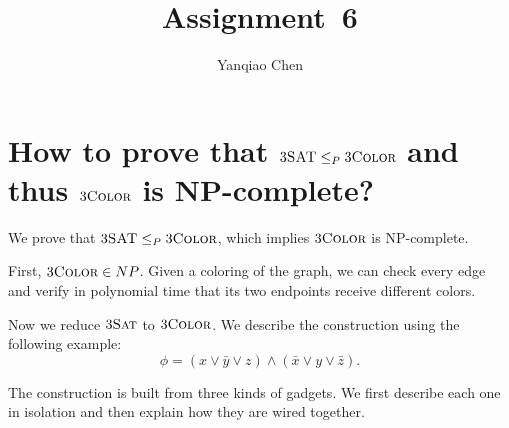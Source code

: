 \documentclass[manuscript,nonacm]{acmart}
\theoremstyle{definition}
\begin{document}
\title{Assignment~6}

\author{Yanqiao Chen}

\maketitle
{}

\section{How to prove that $3\textsc{SAT} \leq_{P} 3\textsc{Color}$ and thus $3\textsc{Color}$ is NP-complete?}

We prove that $3\textsc{SAT} \leq_{P} 3\textsc{Color}$, which implies $3\textsc{Color}$ is NP-complete.

First, $3\textsc{Color}\in NP$.  Given a coloring of the graph, we can check every edge
and verify in polynomial time that its two endpoints receive different colors.

Now we reduce $3\textsc{Sat}$ to $3\textsc{Color}$.  We describe the construction using the
following example:
\[
  \phi=(x\vee \bar y\vee z)\wedge(\bar x\vee y\vee \bar z).
\]

The construction is built from three kinds of gadgets.  We first describe each
one in isolation and then explain how they are wired together.
\end{document}

